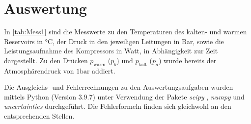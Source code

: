 \section{Auswertung}
\label{sec:Auswertung}
In \autoref{tab:Mess1} sind die Messwerte zu den Temperaturen des kalten- und warmen Reservoirs in °C, der Druck in den jeweiligen Leitungen in Bar, sowie die Leistungsaufnahme 
des Kompressors in Watt, in Abhängigkeit zur Zeit dargestellt. Zu den Drücken $p_\text{warm}$ ($p_b$) und $p_\text{kalt}$ ($p_a$) wurde bereits der Atmosphärendruck von 
$1 \unit{\bar}$ addiert.

Die Ausgleichs- und Fehlerrechnungen zu den Auswertungsaufgaben wurden mittels Python (Version 3.9.7) unter Verwendung der Pakete \textit{scipy} \cite{scipy}, \textit{numpy}
\cite{numpy} und \textit{uncertainties} \cite{uncertainties} durchgeführt. Die Fehlerformeln finden sich gleichwohl an den entsprechenden Stellen.

